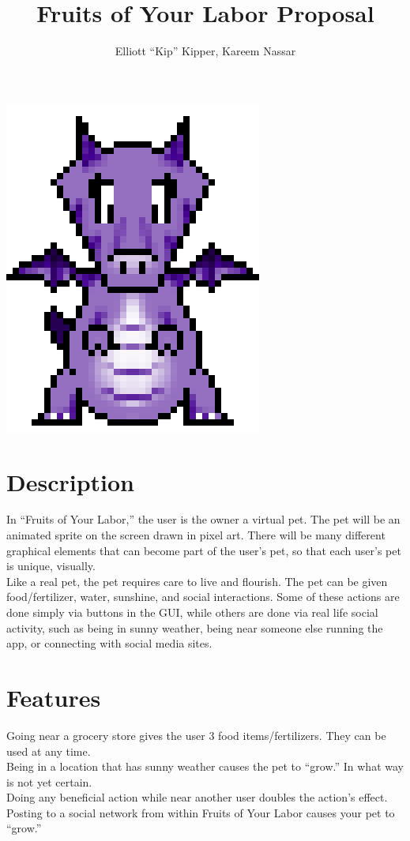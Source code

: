 \documentclass[12pt]{article}
\begin{document}
\title{Fruits of Your Labor Proposal}

\author{Elliott ``Kip'' Kipper, Kareem Nassar}

\maketitle
\begin{center}
\includegraphics[scale = 0.5]{graphics/dragon.png}
\end{center}

\section{Description}
In ``Fruits of Your Labor,'' the user is the owner a virtual pet.  The pet will be an animated sprite on the screen drawn in pixel art.  There will be many different graphical elements that can become part of the user's pet, so that each user's pet is unique, visually.
\\Like a real pet, the pet requires care to live and flourish.  The pet can be given food/fertilizer, water, sunshine, and social interactions.  Some of these actions are done simply via buttons in the GUI, while others are done via real life social activity, such as being in sunny weather, being near someone else running the app, or connecting with social media sites.

\section{Features}
Going near a grocery store gives the user 3 food items/fertilizers.  They can be used at any time.
\\Being in a location that has sunny weather causes the pet to ``grow.''  In what way is not yet certain.
\\Doing any beneficial action while near another user doubles the action's effect.
\\Posting to a social network from within Fruits of Your Labor causes your pet to ``grow.''
\end{document}
